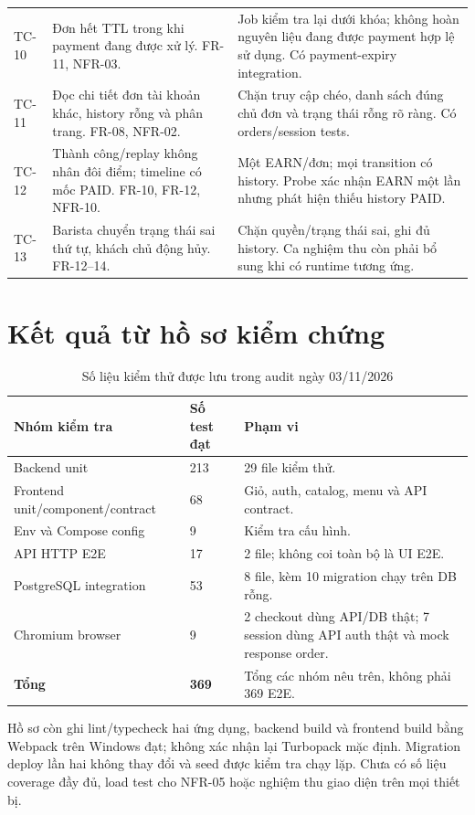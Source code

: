 {\begin{longtable}{@{}L{0.10\textwidth}L{0.39\textwidth}L{0.44\textwidth}@{}}
TC-10 & Đơn hết TTL trong khi payment đang được xử lý. FR-11, NFR-03. & Job kiểm tra lại dưới khóa; không hoàn nguyên liệu đang được payment hợp lệ sử dụng. Có payment-expiry integration. \\
TC-11 & Đọc chi tiết đơn tài khoản khác, history rỗng và phân trang. FR-08, NFR-02. & Chặn truy cập chéo, danh sách đúng chủ đơn và trạng thái rỗng rõ ràng. Có orders/session tests. \\
TC-12 & Thành công/replay không nhân đôi điểm; timeline có mốc PAID. FR-10, FR-12, NFR-10. & Một EARN/đơn; mọi transition có history. Probe xác nhận EARN một lần nhưng phát hiện thiếu history PAID. \\
TC-13 & Barista chuyển trạng thái sai thứ tự, khách chủ động hủy. FR-12--14. & Chặn quyền/trạng thái sai, ghi đủ history. Ca nghiệm thu còn phải bổ sung khi có runtime tương ứng. \\
\end{longtable}}

\section{Kết quả từ hồ sơ kiểm chứng}
\begin{table}[H]
\centering\small
\caption{Số liệu kiểm thử được lưu trong audit ngày 03/11/2026}
\label{tab:testresults}
\begin{tabularx}{\textwidth}{@{}L{0.45\textwidth}L{0.12\textwidth}Y@{}}
\toprule\textbf{Nhóm kiểm tra} & \textbf{Số test đạt} & \textbf{Phạm vi} \\\midrule
Backend unit & 213 & 29 file kiểm thử. \\
Frontend unit/component/contract & 68 & Giỏ, auth, catalog, menu và API contract. \\
Env và Compose config & 9 & Kiểm tra cấu hình. \\
API HTTP E2E & 17 & 2 file; không coi toàn bộ là UI E2E. \\
PostgreSQL integration & 53 & 8 file, kèm 10 migration chạy trên DB rỗng. \\
Chromium browser & 9 & 2 checkout dùng API/DB thật; 7 session dùng API auth thật và mock response order. \\
\midrule
\textbf{Tổng} & \textbf{369} & Tổng các nhóm nêu trên, không phải 369 E2E. \\
\bottomrule
\end{tabularx}
\end{table}

Hồ sơ còn ghi lint/typecheck hai ứng dụng, backend build và frontend
build bằng Webpack trên Windows đạt; không xác nhận lại Turbopack mặc
định. Migration deploy lần hai không thay đổi và seed được kiểm tra chạy
lặp. Chưa có số liệu coverage đầy đủ, load test cho NFR-05 hoặc nghiệm
thu giao diện trên mọi thiết bị.

